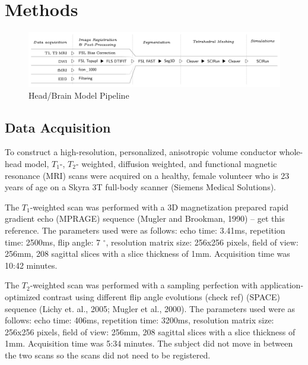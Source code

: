 %

\section{Methods}
\label{sec:Methods}

\begin{figure}[!th]
    \centering
    \includegraphics[width=17cm]{Figures/pipeline}
    \caption{Head/Brain Model Pipeline}
    \label{fig:pipeline}
\end{figure}

\subsection{Data Acquisition}
\label{sec:Data}


To construct a high-resolution, personalized, anisotropic volume conductor whole-head model, $T_1$-, $T_2$- weighted, diffusion weighted, and functional magnetic resonance (MRI) scans were acquired on a healthy, female volunteer who is 23 years of age on a Skyra 3T full-body scanner (Siemens Medical Solutions). 

The $T_1$-weighted scan was performed with a 3D magnetization prepared rapid gradient echo (MPRAGE) sequence (Mugler and Brookman, 1990) -- get this reference. The parameters used were as follows: echo time: 3.41ms, repetition time: 2500ms, flip angle: 7 $^{\circ}$, resolution matrix size: 256x256 pixels, field of view: 256mm, 208 sagittal slices with a slice thickness of 1mm. Acquisition time was 10:42 minutes. 

The $T_2$-weighted scan was performed with a sampling perfection with application-optimized contrast using different flip angle evolutions (check ref) (SPACE) sequence (Lichy et. al., 2005; Mugler et al., 2000). The parameters used were as follows: echo time: 406ms, repetition time: 3200ms, resolution matrix size: 256x256 pixels, field of view: 256mm, 208 sagittal slices with a slice thickness of 1mm. Acquisition time was 5:34 minutes. The subject did not move in between the two scans so the scans did not need to be registered. 

